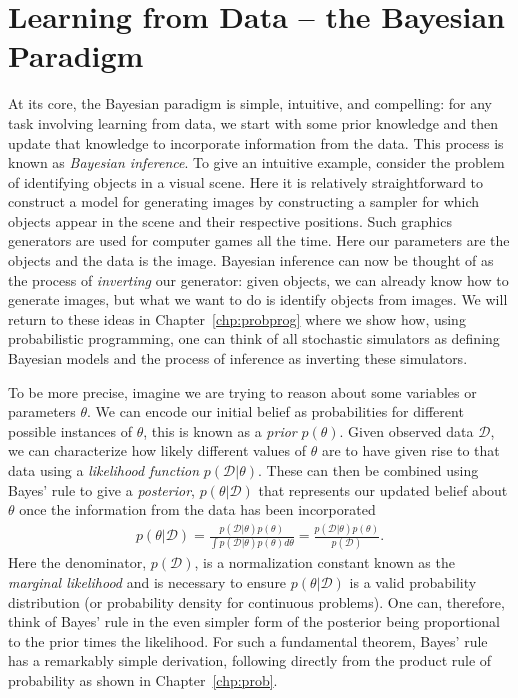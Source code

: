 
\section{Learning from Data -- the Bayesian Paradigm}
\label{sec:bayes:paradigm}

At its core, the Bayesian paradigm is simple, intuitive, and compelling: for any task involving
learning from data, we start with some prior knowledge and then update that knowledge to
incorporate information from the data.  This process is known as \emph{Bayesian inference}.
To give an intuitive example, consider the problem of identifying objects in
a visual scene.  Here it is relatively straightforward to construct a model for generating images by
constructing a sampler for which objects appear in the scene and their respective positions.  Such
graphics generators are used for computer games all the time.  Here our parameters are the objects and
the data is the image.  Bayesian inference can now be thought of as the process of \emph{inverting} our generator:
given objects, we can already know how to generate images, but what we want to do is identify objects from images.  We will return
to these ideas in Chapter~\ref{chp:probprog} where we show how, using probabilistic programming,
one can think of all stochastic simulators as defining Bayesian models and the process of inference as
inverting these simulators.

To be more precise, imagine we are trying to reason about some variables
or parameters $\theta$.  We can encode our initial belief as probabilities for different
possible instances of $\theta$, this is known as a \emph{prior} $p(\theta)$.  Given observed data
$\mathcal{D}$, we can characterize how likely different values of $\theta$ are to have given rise
to that data using a \emph{likelihood function} $p(\mathcal{D}|\theta)$.  These can then be
combined using Bayes' rule to give a \emph{posterior}, $p(\theta | \mathcal{D})$ that 
represents our updated belief about $\theta$ once the information from the data has been
incorporated
\begin{align}
	\label{eq:bayes:bayes}
	p(\theta | \mathcal{D}) = \frac{p(\mathcal{D} | \theta)p(\theta)}{\int p(\mathcal{D} | \theta)p(\theta) d\theta} 
	= \frac{p(\mathcal{D} | \theta)p(\theta)}{p(\mathcal{D})}.
\end{align}
Here the denominator, $p(\mathcal{D})$, is a normalization constant known as the \emph{marginal
	likelihood} and is necessary to ensure $p(\theta | \mathcal{D})$ is a valid probability distribution
(or probability density for continuous problems).  One can, therefore, think of Bayes' rule in the even
simpler form of the posterior being proportional to the prior times the likelihood.
For such a fundamental theorem, Bayes' rule has a remarkably simple derivation, following directly
from the product rule of probability as shown in Chapter~\ref{chp:prob}.

